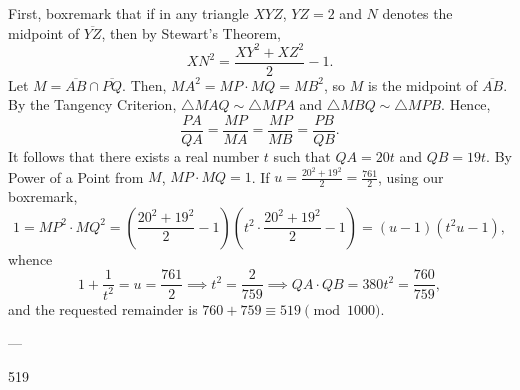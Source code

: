 First, boxremark that if in any triangle $XYZ$, $YZ=2$ and $N$ denotes the midpoint of $\overline{YZ}$, then by Stewart's Theorem, \[XN^2=\frac{XY^2+XZ^2}2-1.\]
Let $M=\overline{AB}\cap\overline{PQ}$. Then, $MA^2=MP\cdot MQ=MB^2$, so $M$ is the midpoint of $\overline{AB}$. By the Tangency Criterion, $\triangle MAQ\sim\triangle MPA$ and $\triangle MBQ\sim\triangle MPB$. Hence, \[\frac{PA}{QA}=\frac{MP}{MA}=\frac{MP}{MB}=\frac{PB}{QB}.\]
It follows that there exists a real number $t$ such that $QA=20t$ and $QB=19t$. By Power of a Point from $M$, $MP\cdot MQ=1$. If $u=\tfrac{20^2+19^2}2=\tfrac{761}2$, using our boxremark, \[1=MP^2\cdot MQ^2=\left(\frac{20^2+19^2}2-1\right)\left(t^2\cdot\frac{20^2+19^2}2-1\right)=(u-1)(t^2u-1),\]
whence \[1+\frac1{t^2}=u=\frac{761}2\implies t^2=\frac2{759}\implies QA\cdot QB=380t^2=\frac{760}{759},\]
and the requested remainder is $760+759\equiv 519\pmod{1000}$.

---

519
